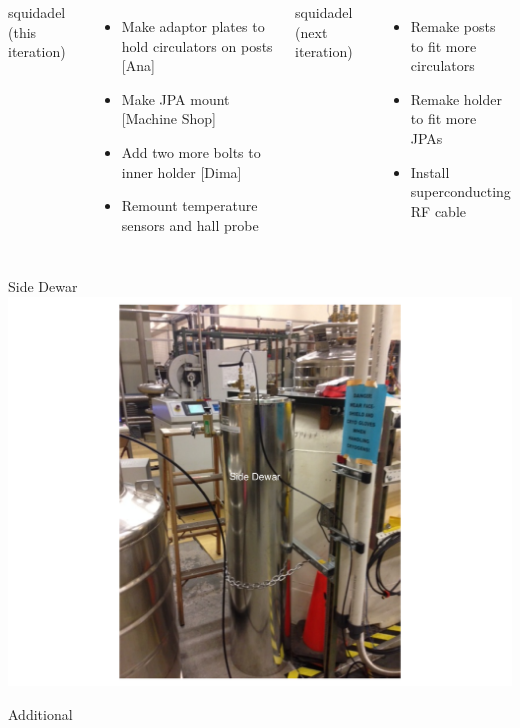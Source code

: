 \documentclass{beamer}
\begin{document}
\begin{frame}
\begin{columns}
{\color{blue} squidadel (this iteration)}
\begin{itemize}
\item[] {\tiny Make adaptor plates to hold circulators on posts [Ana]}
\item[] {\tiny Make JPA mount [Machine Shop]}
\item[] {\tiny Add two more bolts to inner holder [Dima]}
\item[] {\color{red} \tiny Remount temperature sensors and hall probe}
\end{itemize}

{\color{blue} squidadel (next iteration)}
\begin{itemize}
\item[] {\color{red} \tiny Remake posts to fit more circulators}
\item[] {\color{red} \tiny Remake holder to fit more JPAs}
\item[] {\color{red} \tiny Install superconducting RF cable}
\end{itemize}
\end{columns}
\end{frame}

\begin{frame}{Side Dewar}
\includegraphics[width=.7\textwidth]{side_dewar}
\end{frame}

\begin{frame}{Additional}
\end{frame}
\end{document}
